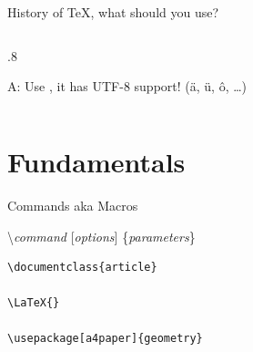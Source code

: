\documentclass[xetex, onlymath]{beamer}
\begin{document}
\begin{frame}{History of \textrm{\TeX}, what should you use?}
\begin{columns}
\begin{column}{.8\textwidth}
\begin{figure}
      \end{figure}
      \begin{center}
        A: Use \textrm{}, it has UTF-8 support! (\"a, \"u, \^o, \ldots)
      \end{center}
    \end{column}
  \end{columns}
\end{frame}

\section{Fundamentals}
\begin{frame}[fragile]{Commands aka Macros}
\begin{block}{}
\LARGE
\textcolor{hsr-mauve60}{\textbackslash\textit{command}}
\textcolor{hsr-lakegreen}{[\textit{options}]}
\textcolor{hsr-blue}{\{\textit{parameters}\}}
\end{block}
\begin{exampleblock}{}
\Large
\begin{verbatim}
\documentclass{article}

\LaTeX{}

\usepackage[a4paper]{geometry}
\end{verbatim}
\end{exampleblock}
\end{frame}
\end{document}

